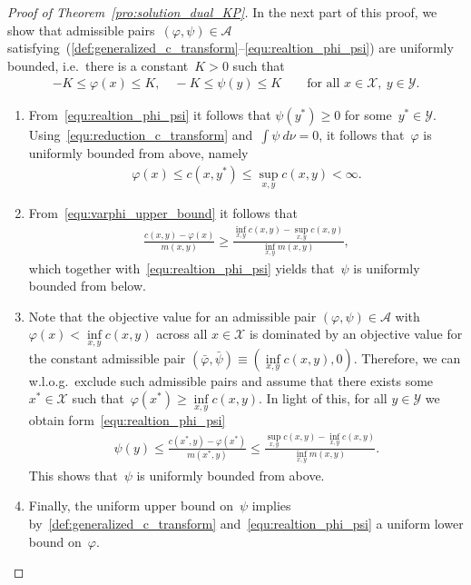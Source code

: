 \documentclass{article}
\theoremstyle{definition}
\begin{document}
\begin{proof}[Proof of Theorem~\ref{pro:solution_dual_KP}]
In the next part of this proof, we show that admissible pairs~$(\varphi, \psi) \in \mathcal{A}$ satisfying~(\ref{def:generalized_c_transform}--\ref{equ:realtion_phi_psi}) are uniformly bounded, i.e.~there is a constant~$K>0$ such that
\begin{align}\label{equ:uniform_boundedness_phi_psi}
    -K \leq \varphi(x) \leq K, \quad  -K \leq \psi(y) \leq K \qquad \mbox{for all $x\in \mathcal{X}, \ y \in \mathcal{Y}$}.
\end{align}
\begin{enumerate}
    \item[(i)]  From~\eqref{equ:realtion_phi_psi} it follows that $\psi(y^*) \geq 0$ for some~$y^* \in \mathcal{Y}$. Using~\eqref{equ:reduction_c_transform} and~$\int \psi \ d \nu =0$, it follows that~$\varphi$ is uniformly bounded from above, namely
\begin{align}\label{equ:varphi_upper_bound}
    \varphi(x) \leq c(x,y^*) \leq \sup_{x,y} c(x,y) < \infty.  
\end{align}

\item[(ii)] From~\eqref{equ:varphi_upper_bound} it follows that
\begin{align*}
    \frac{c(x,y) - \varphi(x)}{m(x,y)} \geq \frac{\inf_{x,y} c(x,y) - \sup_{x,y} c(x,y)}{\inf_{x,y} m(x,y)},
\end{align*}
which together with~\eqref{equ:realtion_phi_psi} yields  that~$\psi$ is uniformly bounded from below.

\item[(iii)] Note that the objective value for an admissible pair $(\varphi, \psi) \in \mathcal{A}$ with $\varphi(x) < \inf\limits_{x,y} c(x,y)$ across all $x \in \mathcal{X}$ is dominated by an objective value for the constant admissible pair $(\bar{\varphi}, \bar{\psi}) \equiv (\inf\limits_{x,y} c(x,y), 0)$. Therefore, we can w.l.o.g.~exclude such admissible pairs and assume that there exists some~$x^* \in \mathcal{X}$ such that~$\varphi(x^*) \geq \inf\limits_{x,y} c(x,y)$. In light of this, for all $y \in \mathcal{Y}$ we obtain form~\eqref{equ:realtion_phi_psi}
\begin{align*}
    \psi(y) \leq \frac{c(x^*, y) - \varphi(x^*)}{m(x^*, y)} \leq \frac{\sup_{x,y} c(x,y) - \inf_{x,y} c(x,y)}{\inf_{x,y} m(x,y)}.
\end{align*}
This shows that~$\psi$ is uniformly bounded from above.

\item[(iv)] Finally, the uniform upper bound on~$\psi$ implies by~\eqref{def:generalized_c_transform} and~\eqref{equ:realtion_phi_psi} a uniform lower bound on~$\varphi$.
\end{enumerate}





\end{proof}
\end{document}
